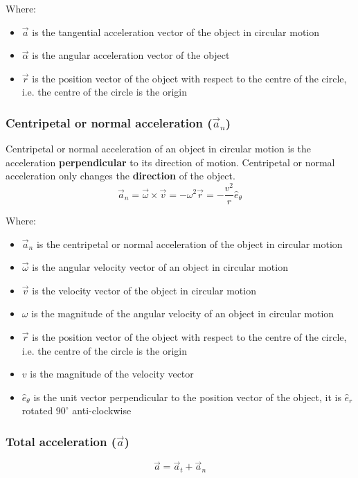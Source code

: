 \documentclass[11pt]{article}
\begin{document}
Where:
\begin{itemize}
\item \(\vec{a}\) is the tangential acceleration vector of the object in circular motion
\item \(\vec{\alpha}\) is the angular acceleration vector of the object
\item \(\vec{r}\) is the position vector of the object with respect to the centre of the circle, i.e. the centre of the circle is the origin
\end{itemize}

 \newpage
\subsubsection{Centripetal or normal acceleration (\(\vec{a}_n\))}
\label{sec:org74c0044}
Centripetal or normal acceleration of an object in circular motion is the acceleration \textbf{perpendicular} to its direction of motion. Centripetal or normal acceleration only changes the \textbf{direction} of the object.
\[\vec{a}_n = \vec{\omega} \times \vec{v} = - \omega^2 \vec{r} = - \frac{v^2}{r} \hat{e}_{\theta}\]

Where:
\begin{itemize}
\item \(\vec{a}_n\) is the centripetal or normal acceleration of the object in circular motion
\item \(\vec{\omega}\) is the angular velocity vector of an object in circular motion
\item \(\vec{v}\) is the velocity vector of the object in circular motion
\item \(\omega\) is the magnitude of the angular velocity of an object in circular motion
\item \(\vec{r}\) is the position vector of the object with respect to the centre of the circle, i.e. the centre of the circle is the origin
\item \(v\) is the magnitude of the velocity vector
\item \(\hat{e}_{\theta}\) is the unit vector perpendicular to the position vector of the object, it is \(\hat{e}_r\) rotated \(90^{\circ}\) anti-clockwise
\end{itemize}
\subsubsection{Total acceleration (\(\vec{a}\))}
\label{sec:orgc200a9d}
\[\vec{a} = \vec{a}_t + \vec{a}_n\]
\end{document}
